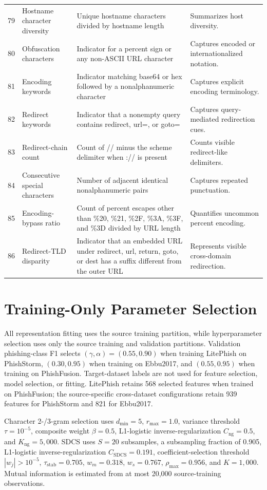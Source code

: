 \documentclass[10pt]{article}
\begin{document}
\begin{longtable}{r L{3.4cm} L{5.1cm} L{6.0cm}}
79 & Hostname character diversity & Unique hostname characters divided by hostname length & Summarizes host diversity. \\
80 & Obfuscation characters & Indicator for a percent sign or any non-ASCII URL character & Captures encoded or internationalized notation. \\
81 & Encoding keywords & Indicator matching base64 or hex followed by a nonalphanumeric character & Captures explicit encoding terminology. \\
82 & Redirect keywords & Indicator that a nonempty query contains redirect, url=, or goto= & Captures query-mediated redirection cues. \\
83 & Redirect-chain count & Count of // minus the scheme delimiter when :// is present & Counts visible redirect-like delimiters. \\
84 & Consecutive special characters & Number of adjacent identical nonalphanumeric pairs & Captures repeated punctuation. \\
85 & Encoding-bypass ratio & Count of percent escapes other than \%20, \%21, \%2F, \%3A, \%3F, and \%3D divided by URL length & Quantifies uncommon percent encoding. \\
86 & Redirect-TLD disparity & Indicator that an embedded URL under redirect, url, return, goto, or dest has a suffix different from the outer URL & Represents visible cross-domain redirection. \\
\bottomrule
\end{longtable}
\normalsize

\color{supportingtext}
\section{Training-Only Parameter Selection}

All representation fitting uses the source training partition, while hyperparameter selection uses only the source training and validation partitions. Validation phishing-class F1 selects \((\gamma,\alpha)=(0.55,0.90)\) when training LitePhish on PhishStorm, \((0.30,0.95)\) when training on Ebbu2017, and \((0.55,0.95)\) when training on PhishFusion. Target-dataset labels are not used for feature selection, model selection, or fitting. LitePhish retains 568 selected features when trained on PhishFusion; the source-specific cross-dataset configurations retain 939 features for PhishStorm and 821 for Ebbu2017.

Character 2-/3-gram selection uses \(d_{\min}=5\), \(r_{\max}=1.0\), variance threshold \(\tau=10^{-5}\), composite weight \(\beta=0.5\), L1-logistic inverse-regularization \(C_{\mathrm{ng}}=0.5\), and \(K_{\mathrm{ng}}=5,000\). SDCS uses \(S=20\) subsamples, a subsampling fraction of 0.905, L1-logistic inverse-regularization \(C_{\mathrm{SDCS}}=0.191\), coefficient-selection threshold \(|w_j|>10^{-5}\), \(\tau_{\mathrm{stab}}=0.705\), \(w_m=0.318\), \(w_s=0.767\), \(\rho_{\max}=0.956\), and \(K=1,000\). Mutual information is estimated from at most 20,000 source-training observations.
\end{document}
